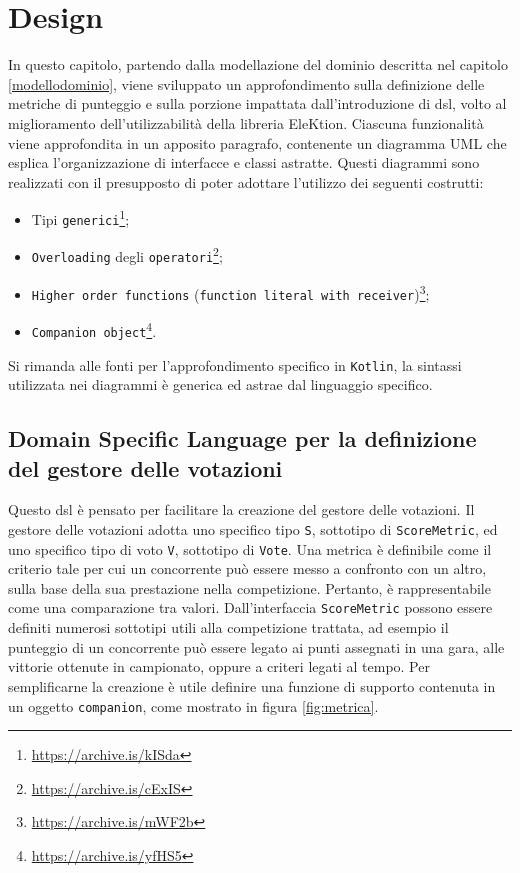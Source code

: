 \documentclass[12pt,a4paper,openright,twoside]{book}
\begin{document}
\chapter{Design}
\label{designdsl}
In questo capitolo, partendo dalla modellazione del dominio descritta nel capitolo \ref{modellodominio}, 
viene sviluppato un approfondimento sulla definizione delle metriche di punteggio e sulla porzione
impattata dall'introduzione di \ac{dsl}, volto al miglioramento dell'utilizzabilità della libreria EleKtion.
Ciascuna funzionalità viene approfondita in un apposito paragrafo, contenente un diagramma UML
che esplica l'organizzazione di interfacce e classi astratte.
Questi diagrammi sono realizzati con il presupposto di poter adottare l'utilizzo
dei seguenti costrutti:
\begin{itemize}
\item{Tipi \texttt{generici}\footnote{\url{https://archive.is/kISda}};}
\item{\texttt{Overloading} degli \texttt{operatori}\footnote{\url{https://archive.is/cExIS}};}
\item{\texttt{Higher order functions} (\texttt{function literal with receiver})\footnote{\url{https://archive.is/mWF2b}};}
\item{\texttt{Companion object}\footnote{\url{https://archive.is/yfHS5}}.}
\end{itemize}
Si rimanda alle fonti per l'approfondimento specifico in \texttt{Kotlin}, la sintassi utilizzata nei diagrammi
è generica ed astrae dal linguaggio specifico.
\section{Domain Specific Language per la definizione del gestore delle votazioni }
Questo \ac{dsl} è pensato per facilitare la creazione del gestore delle votazioni.
Il gestore delle votazioni adotta uno specifico tipo \texttt{S}, sottotipo di \texttt{ScoreMetric}, ed uno specifico
tipo di voto \texttt{V}, sottotipo di \texttt{Vote}.
Una metrica è definibile come il criterio tale per cui un concorrente può essere messo a confronto con un altro, sulla base della
sua prestazione nella competizione. Pertanto, è rappresentabile come una comparazione tra valori.
Dall'interfaccia \texttt{ScoreMetric} possono essere definiti numerosi sottotipi utili alla competizione trattata, ad esempio il punteggio di un concorrente
può essere legato ai punti assegnati in una gara, alle vittorie ottenute in campionato, oppure a criteri legati al tempo.
Per semplificarne la creazione è utile definire una funzione di supporto contenuta in un oggetto \texttt{companion}, come mostrato in figura \ref{fig:metrica}.
\end{document}
